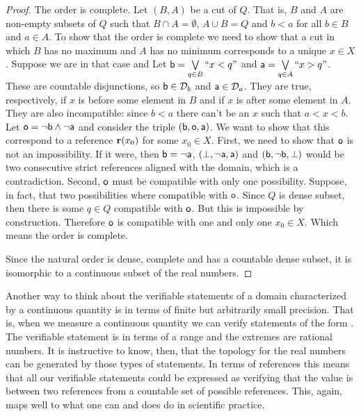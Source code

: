 \begin{mathSection}
\begin{proof}
		The order is complete. Let $(B,A)$ be a cut of $Q$. That is, $B$ and $A$ are non-empty subsets of $Q$ such that $B \cap A = \emptyset$, $A \cup B = Q$ and $b < a$ for all $b \in B$ and $a \in A$. To show that the order is complete we need to show that a cut in which $B$ has no maximum and $A$ has no minimum corresponds to a unique $x \in X$. Suppose we are in that case and Let $\stmt[b] = \bigOR\limits_{q \in B} ``x < q"$ and $\stmt[a] = \bigOR\limits_{q \in A} ``x > q"$. These are countable disjunctions, so $\stmt[b] \in \edomain_b$ and $\stmt[a] \in \edomain_a$. They are true, respectively, if $x$ is before some element in $B$ and if $x$ is after some element in $A$. They are also incompatible: since $b < a$ there can't be an $x$ such that $a < x < b$. Let $\stmt[o] = \NOT \stmt[b] \AND \NOT \stmt[a]$ and consider the triple $(\stmt[b], \stmt[o], \stmt[a])$. We want to show that this correspond to a reference $\refStmt(x_0)$ for some $x_0 \in X$. First, we need to show that $\stmt[o]$ is not an impossibility. If it were, then $\stmt[b] = \NOT \stmt[a]$, $(\impossibility, \NOT \stmt[a], \stmt[a])$ and $(\stmt[b], \NOT \stmt[b], \impossibility)$ would be two consecutive strict references aligned with the domain, which is a contradiction. Second, $\stmt[o]$ must be compatible with only one possibility. Suppose, in fact, that two possibilities where compatible with $\stmt[o]$. Since $Q$ is dense subset, then there is some $q \in Q$ compatible with $\stmt[o]$. But this is impossible by construction. Therefore $\stmt[o]$ is compatible with one and only one $x_0 \in X$. Which means the order is complete.
		
		Since the natural order is dense, complete and has a countable dense subset, it is isomorphic to a continuous subset of the real numbers.
	\end{proof}
\end{mathSection}

Another way to think about the verifiable statements of a domain characterized by a continuous quantity is in terms of finite but arbitrarily small precision. That is, when we measure a continuous quantity we can verify statements of the form . The verifiable statement is in terms of a range and the extremes are rational numbers. It is instructive to know, then, that the topology for the real numbers can be generated by those types of statements. In terms of references this means that all our verifiable statements could be expressed as verifying that the value is between two references from a countable set of possible references. This, again, maps well to what one can and does do in scientific practice.

